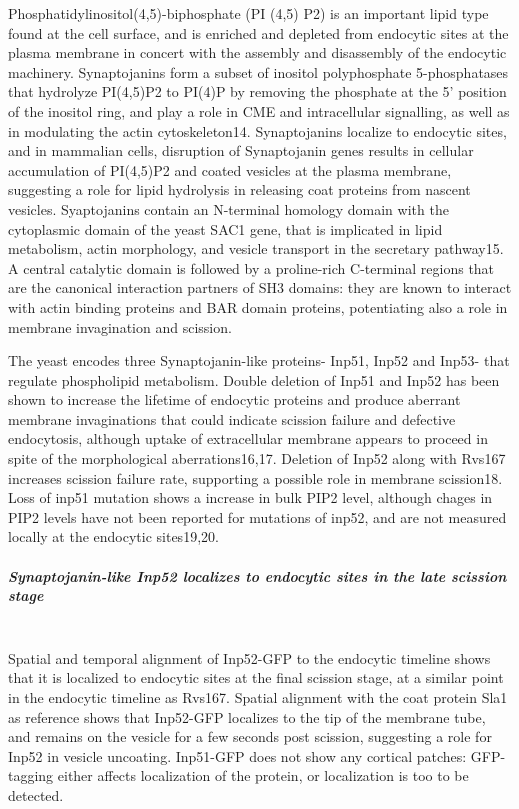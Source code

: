 	\vspace{5mm}
	Phosphatidylinositol(4,5)-biphosphate (PI (4,5) P2) is an important lipid type found at the cell surface, and is enriched and depleted from endocytic sites at the plasma membrane in concert with the assembly and disassembly of the endocytic machinery. Synaptojanins form a subset of inositol polyphosphate 5-phosphatases that hydrolyze PI(4,5)P2 to PI(4)P by removing the phosphate at the 5’ position of the inositol ring, and play a role in CME and intracellular signalling, as well as in modulating the actin cytoskeleton14. Synaptojanins localize to endocytic sites, and in mammalian cells, disruption of Synaptojanin genes results in cellular accumulation of PI(4,5)P2 and coated vesicles at the plasma membrane, suggesting a role for lipid hydrolysis in releasing coat proteins from nascent vesicles. Syaptojanins contain an N-terminal homology domain with the cytoplasmic domain of the yeast SAC1 gene, that is implicated in lipid metabolism, actin morphology, and vesicle transport in the secretary pathway15. A central catalytic domain is followed by a proline-rich C-terminal regions that are the canonical interaction partners of SH3 domains: they are known to interact with actin binding proteins and BAR domain proteins, potentiating also a role in membrane invagination and scission. 
		
	\vspace{5mm}
	The yeast encodes three Synaptojanin-like proteins- Inp51, Inp52 and Inp53- that regulate phospholipid metabolism. Double deletion of Inp51 and Inp52 has been shown to increase the lifetime of endocytic proteins and produce aberrant membrane invaginations that could indicate scission failure and defective endocytosis, although uptake of extracellular membrane appears to proceed in spite of the morphological aberrations16,17. Deletion of Inp52 along with Rvs167 increases scission failure rate, supporting a possible role in membrane scission18. Loss of inp51 mutation shows a increase in bulk PIP2 level, although chages in PIP2 levels have not been reported for mutations of inp52, and are not measured locally at the endocytic sites19,20.
		

		\subparagraph{Synaptojanin-like Inp52 localizes to endocytic sites in the late scission stage}
		\mbox{}\\
		Spatial and temporal alignment of Inp52-GFP to the endocytic timeline shows that it is localized to endocytic sites at the final scission stage, at a similar point in the endocytic timeline as Rvs167. Spatial alignment with the coat protein Sla1 as reference shows that Inp52-GFP localizes to the tip of the membrane tube, and remains on the vesicle for a few seconds post scission, suggesting a role for Inp52 in vesicle uncoating. Inp51-GFP does not show any cortical patches: GFP-tagging either affects localization of the protein, or localization is too to be detected.
		
